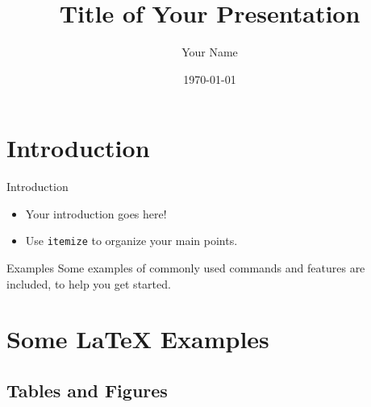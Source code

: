 \documentclass[
	hyperref={unicode},	%
	url={hyphens},
	english
	]{beamer}
\title[Your Short Title]{Title of Your Presentation}
\author{Your Name}
\institute{Where You're From}
\date{\today}
\begin{document}
\begin{frame}
  \titlepage
\end{frame}


\section{Introduction}

\begin{frame}{Introduction}

\begin{itemize}
  \item Your introduction goes here!
  \item Use \texttt{itemize} to organize your main points.
\end{itemize}

\vskip 1cm

\begin{block}{Examples}
Some examples of commonly used commands and features are included, to help you get started.
\end{block}

\end{frame}

\section{Some \LaTeX{} Examples}


\subsection{Tables and Figures}
\end{document}
